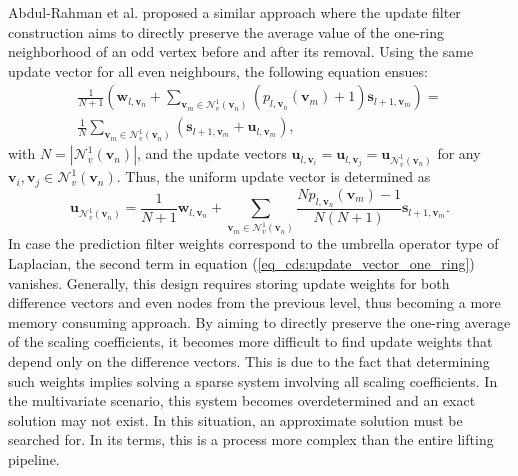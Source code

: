 \documentclass[graybox]{svmult}
\begin{document}
	Abdul-Rahman et al. \cite{AbdulRahman2013} proposed a similar approach where the update filter construction aims to directly preserve the average value of the one-ring neighborhood of an odd vertex before and after its removal. Using the same update vector for all even neighbours, the following equation ensues:
	\begin{eqnarray}
	\frac{1}{ N + 1} \left( \mathbf{w}_{l, \mathbf{v}_n} + \sum\limits_{\mathbf{v}_m \in \mathcal{N}_v^1(\mathbf{v}_n) } { (  p_{l, \mathbf{v}_n}(\mathbf{v}_m) + 1 ) \mathbf{s}_{l+1, \mathbf{v}_m} } \right) = \\ \frac{1}{N} \sum\limits_{\mathbf{v}_m \in \mathcal{N}_v^1(\mathbf{v}_n) } { (  \mathbf{s}_{l+1, \mathbf{v}_m} + \mathbf{u}_{l,\mathbf{v}_m} ) } ,
	\label{eq_cds:one_ring_average}
	\end{eqnarray}
	with $N = | \mathcal{N}_v^1(\mathbf{v}_n) |$, and the update vectors $\mathbf{u}_{l,\mathbf{v}_i} = \mathbf{u}_{l,\mathbf{v}_j} = \mathbf{u}_{\mathcal{N}_v^1(\mathbf{v}_n)} $ for any $\mathbf{v}_i, \mathbf{v}_j \in \mathcal{N}_v^1(\mathbf{v}_n)$. Thus, the uniform update vector is determined as
	\begin{equation}
	\mathbf{ u}_{\mathcal{N}_v^1(\mathbf{v}_n)} = \frac{1}{N + 1} \mathbf{w}_{l, \mathbf{v}_n}  + \sum\limits_{\mathbf{v}_m \in \mathcal{N}_v^1(\mathbf{v}_n) } { \frac{ N  p_{l, \mathbf{v}_n}(\mathbf{v}_m) - 1 }{N (N +1 ) } \mathbf{s}_{l+1, \mathbf{v}_m} }.
	\label{eq_cds:update_vector_one_ring}
	\end{equation}
	In case the prediction filter weights correspond to the umbrella operator type of Laplacian, the second term in equation (\ref{eq_cds:update_vector_one_ring}) vanishes. Generally, this design requires storing update weights for both difference vectors and even nodes from the previous level, thus becoming a more memory consuming approach.
	By aiming to directly preserve the one-ring average of the scaling coefficients, it becomes more difficult to find update weights that depend only on the difference vectors. This is due to the fact that determining such weights implies solving a sparse system involving all scaling coefficients. In the multivariate scenario, this system becomes overdetermined and an exact solution may not exist. In this situation, an approximate solution must be searched for. In its terms, this is a process more complex than the entire lifting pipeline.
	
\end{document}
